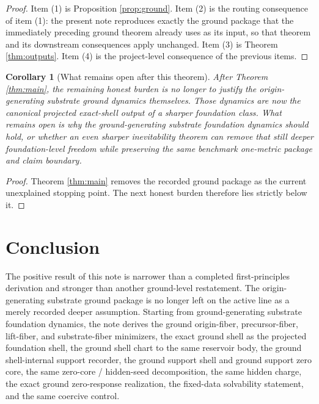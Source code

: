 \documentclass[11pt]{article}
\newtheorem{corollary}{Corollary}
\begin{document}
\begin{proof}
Item (1) is Proposition \ref{prop:ground}. Item (2) is the routing consequence of item (1): the present note reproduces exactly the ground package that the immediately preceding ground theorem already uses as its input, so that theorem and its downstream consequences apply unchanged. Item (3) is Theorem \ref{thm:outputs}. Item (4) is the project-level consequence of the previous items.
\end{proof}

\begin{corollary}[What remains open after this theorem]
\label{cor:next}
After Theorem \ref{thm:main}, the remaining honest burden is no longer to justify the origin-generating substrate ground dynamics themselves. Those dynamics are now the canonical projected exact-shell output of a sharper foundation class. What remains open is why the ground-generating substrate foundation dynamics should hold, or whether an even sharper inevitability theorem can remove that still deeper foundation-level freedom while preserving the same benchmark one-metric package and claim boundary.
\end{corollary}

\begin{proof}
Theorem \ref{thm:main} removes the recorded ground package as the current unexplained stopping point. The next honest burden therefore lies strictly below it.
\end{proof}

\section{Conclusion}

The positive result of this note is narrower than a completed first-principles derivation and stronger than another ground-level restatement. The origin-generating substrate ground package is no longer left on the active line as a merely recorded deeper assumption. Starting from ground-generating substrate foundation dynamics, the note derives the ground origin-fiber, precursor-fiber, lift-fiber, and substrate-fiber minimizers, the exact ground shell as the projected foundation shell, the ground shell chart to the same reservoir body, the ground shell-internal support recorder, the ground support shell and ground support zero core, the same zero-core / hidden-seed decomposition, the same hidden charge, the exact ground zero-response realization, the fixed-data solvability statement, and the same coercive control.
\end{document}
